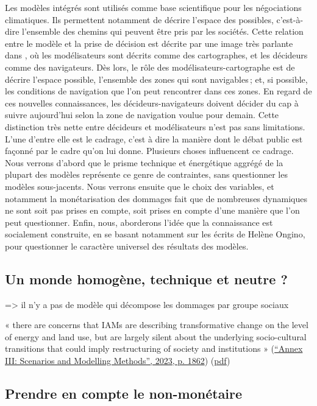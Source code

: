 Les modèles intégrés sont utilisés comme base scientifique pour les négociations climatiques. Ils permettent notamment de décrire l'espace des possibles, c'est-à-dire l'ensemble des chemins qui peuvent être pris par les sociétés. Cette relation entre le modèle et la prise de décision est décrite par une image très parlante dans \cite{edenhofer_mapmakers_2014}, où les modélisateurs sont décrits comme des cartographes, et les décideurs comme des navigateurs. Dès lors, le rôle des modélisateurs-cartographe est de décrire l'espace possible, l'ensemble des zones qui sont navigables ; et, si possible, les conditions de navigation que l'on peut rencontrer dans ces zones.  En regard de ces nouvelles connaissances, les décideurs-navigateurs doivent décider du cap à suivre aujourd'hui selon la zone de navigation voulue pour demain. Cette distinction très nette entre décideurs et modélisateurs n'est pas sans limitations. L'une d'entre elle est le cadrage, c'est à dire la manière dont le débat public est façonné par le cadre qu'on lui donne.  Plusieurs choses influencent ce cadrage. Nous verrons d'abord que le prisme technique et énergétique aggrégé de la plupart des modèles représente ce genre de contraintes, sans questionner les modèles sous-jacents. Nous verrons ensuite que le choix des variables, et notamment la monétarisation des dommages fait que de nombreuses dynamiques ne sont soit pas prises en compte, soit prises en compte d'une manière que l'on peut questionner. Enfin, nous, aborderons l'idée que la connaissance est socialement construite, en se basant notamment sur les écrits de Helène Ongino, pour questionner le caractère universel des résultats des modèles. 

\subsection{Un monde homogène, technique et neutre ?}

=> il n'y a pas de modèle qui décompose les dommages par groupe sociaux


« there are concerns that IAMs are describing transformative change on the level of energy and land use, but are largely silent about the underlying socio-cultural transitions that could imply restructuring of society and institutions » (\href{zotero://select/library/items/2SDDNUUF}{“Annex III: Scenarios and Modelling Methods”, 2023, p. 1862}) (\href{zotero://open-pdf/library/items/CHVFSLLH?page=22&annotation=JY4VBIZY}{pdf})

 \subsection{Prendre en compte le non-monétaire}


